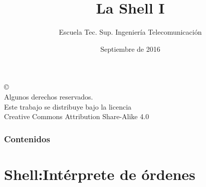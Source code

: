 \documentclass[ucs]{beamer}
\begin{document}
\title[La Shell I]{La Shell I}

\author[GSyC]{Escuela Tec. Sup. Ingeniería Telecomunicación}
\date[2016]{Septiembre de 2016}

\begin{frame}
  \titlepage
\end{frame}



\begin{frame}[b]
\begin{flushright}
{\tiny
\copyright \insertshortdate~\insertshortauthor \\
  Algunos derechos reservados. \\
  Este trabajo se distribuye bajo la licencia \\
  Creative Commons Attribution Share-Alike 4.0
}
\end{flushright}  
\end{frame}



\begin{frame}
  \frametitle{Contenidos}
  \tableofcontents
\end{frame}




\section{Shell:Intérprete de órdenes}
\end{document}
